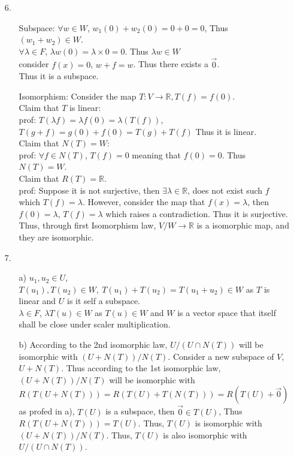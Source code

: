 \documentclass{article}
\begin{document}
\begin{itemize}
    \newpage
    \item [6.] \
    \begin{itemize}
        \item [Subspace:] \(\forall w\in W\), \(w_1(0)+w_2(0)=0+0=0\), Thus \((w_1+w_2)\in W\).\\
                        \(\forall \lambda \in F\), \(\lambda w(0)=\lambda \times 0 = 0\). Thus \(\lambda w \in W\)\\
                        consider \(f(x)=0\), \(w+f=w\). Thus there exists a \(\overrightarrow{0}\).\\
                        Thus it is a subspace.
        \item  [Isomorphism:] Consider the map \(T:V\rightarrow \mathbb{R},T(f)=f(0)\).\\
        Claim that \(T\) is linear:\\
        prof: \(T(\lambda f) = \lambda f(0) = \lambda (T(f))\), \(T(g+f)=g(0)+f(0)=T(g)+T(f)\) 
        Thus it is linear. \\
        Claim that \(N(T) = W\):\\
        prof: \(\forall f \in N(T)\), \(T(f)=0\) meaning that \(f(0)=0\). Thus \(N(T)=W\).\\
        Claim that \(R(T)=\mathbb{R}\).\\
        prof: Suppose it is not surjective, then \(\exists \lambda\in\mathbb{R}\), does not exist such \(f\) which \(T(f)=\lambda\). However, consider the map that \(f(x)=\lambda\), then \(f(0)=\lambda\), \(T(f)=\lambda\) which raises a contradiction. Thus it is surjective.\\
        Thus, through first Isomorphism law, \(V/W\rightarrow \mathbb{R}\) is a isomorphic map, and they are isomorphic.
    \end{itemize}
    \item [7.]
    \begin{itemize}
        \item [a)]
        \(u_1,u_2\in U\), \(T(u_1),T(u_2)\in W, \ T(u_1)+T(u_2)=T(u_1+u_2)\in W\) as \(T\) is linear and \(U\) is it self a subspace.\\
        \(\lambda\in F\), \(\lambda T(u) \in W\) as \(T(u)\in W\) and \(W\) is a vector space that itself shall be close under scaler multiplication.
        \item [b)]
        According to the 2nd isomorphic law, \(U/(U\cap N(T))\) will be isomorphic with \((U+N(T))/N(T)\). Consider a new subspace of \(V\), \(U+N(T)\).
        Thus according to the 1st isomorphic law, \((U+N(T))/N(T)\) will be isomorphic with \(R(T(U+N(T)))=R(T(U)+T(N(T)))=R(T(U)+\overrightarrow{0})\) as profed in a), \(T(U)\) is a subspace, then \(\overrightarrow{0}\in T(U)\), Thus \(R(T(U+N(T)))=T(U)\). Thus, \(T(U)\) is isomorphic with \((U+N(T))/N(T)\). Thus, \(T(U)\) is also isomorphic with \(U/(U\cap N(T))\).

\end{itemize}
\end{itemize}
\end{document}
